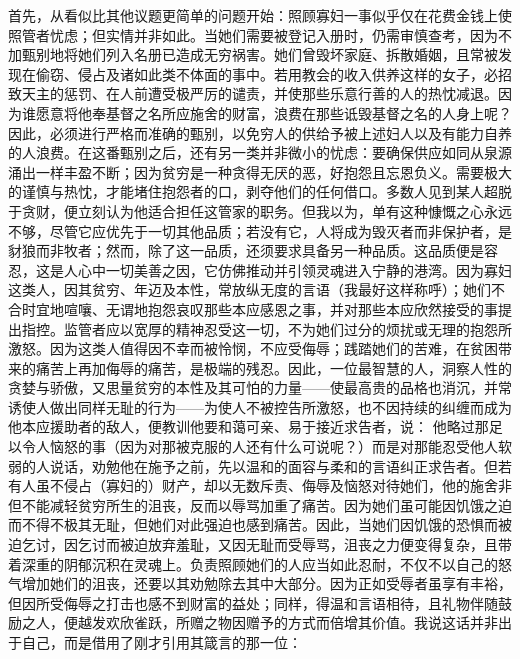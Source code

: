 首先，从看似比其他议题更简单的问题开始：照顾寡妇一事似乎仅在花费金钱上使照管者忧虑；但实情并非如此。当她们需要被登记入册时，仍需审慎查考，因为不加甄别地将她们列入名册已造成无穷祸害。她们曾毁坏家庭、拆散婚姻，且常被发现在偷窃、侵占及诸如此类不体面的事中。若用教会的收入供养这样的女子，必招致天主的惩罚、在人前遭受极严厉的谴责，并使那些乐意行善的人的热忱减退。因为谁愿意将他奉基督之名所应施舍的财富，浪费在那些诋毁基督之名的人身上呢？因此，必须进行严格而准确的甄别，以免穷人的供给予被上述妇人以及有能力自养的人浪费。在这番甄别之后，还有另一类并非微小的忧虑：要确保供应如同从泉源涌出一样丰盈不断；因为贫穷是一种贪得无厌的恶，好抱怨且忘恩负义。需要极大的谨慎与热忱，才能堵住抱怨者的口，剥夺他们的任何借口。多数人见到某人超脱于贪财，便立刻认为他适合担任这管家的职务。但我以为，单有这种慷慨之心永远不够，尽管它应优先于一切其他品质；若没有它，人将成为毁灭者而非保护者，是豺狼而非牧者；然而，除了这一品质，还须要求具备另一种品质。这品质便是容忍，这是人心中一切美善之因，它仿佛推动并引领灵魂进入宁静的港湾。因为寡妇这类人，因其贫穷、年迈及本性，常放纵无度的言语（我最好这样称呼）；她们不合时宜地喧嚷、无谓地抱怨哀叹那些本应感恩之事，并对那些本应欣然接受的事提出指控。监管者应以宽厚的精神忍受这一切，不为她们过分的烦扰或无理的抱怨所激怒。因为这类人值得因不幸而被怜悯，不应受侮辱；践踏她们的苦难，在贫困带来的痛苦上再加侮辱的痛苦，是极端的残忍。因此，一位最智慧的人，洞察人性的贪婪与骄傲，又思量贫穷的本性及其可怕的力量——使最高贵的品格也消沉，并常诱使人做出同样无耻的行为——为使人不被控告所激怒，也不因持续的纠缠而成为他本应援助者的敌人，便教训他要和蔼可亲、易于接近求告者，说： 他略过那足以令人恼怒的事（因为对那被克服的人还有什么可说呢？）而是对那能忍受他人软弱的人说话，劝勉他在施予之前，先以温和的面容与柔和的言语纠正求告者。但若有人虽不侵占（寡妇的）财产，却以无数斥责、侮辱及恼怒对待她们，他的施舍非但不能减轻贫穷所生的沮丧，反而以辱骂加重了痛苦。因为她们虽可能因饥饿之迫而不得不极其无耻，但她们对此强迫也感到痛苦。因此，当她们因饥饿的恐惧而被迫乞讨，因乞讨而被迫放弃羞耻，又因无耻而受辱骂，沮丧之力便变得复杂，且带着深重的阴郁沉积在灵魂上。负责照顾她们的人应当如此忍耐，不仅不以自己的怒气增加她们的沮丧，还要以其劝勉除去其中大部分。因为正如受辱者虽享有丰裕，但因所受侮辱之打击也感不到财富的益处；同样，得温和言语相待，且礼物伴随鼓励之人，便越发欢欣雀跃，所赠之物因赠予的方式而倍增其价值。我说这话并非出于自己，而是借用了刚才引用其箴言的那一位：\par

